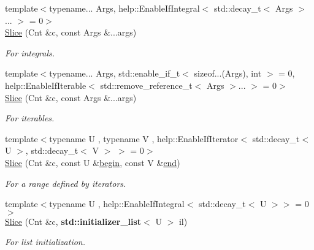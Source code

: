 \begin{DoxyCompactItemize}
\item 
{\footnotesize template$<$typename... Args, help\+::\+Enable\+If\+Integral$<$ std\+::decay\+\_\+t$<$ Args $>$... $>$  = 0$>$ }\\\hyperlink{classcnt_1_1help_1_1Slice_a4ee48993f74932456f8bc49790bd0c6f}{Slice} (Cnt \&c, const Args \&...args)
\begin{DoxyCompactList}\small\item\em For integrals. \end{DoxyCompactList}\item 
{\footnotesize template$<$typename... Args, std\+::enable\+\_\+if\+\_\+t$<$ sizeof...(\+Args), int $>$  = 0, help\+::\+Enable\+If\+Iterable$<$ std\+::remove\+\_\+reference\+\_\+t$<$ Args $>$... $>$  = 0$>$ }\\\hyperlink{classcnt_1_1help_1_1Slice_ad48e78da8f37d92bb4f9a8a913270cfe}{Slice} (Cnt \&c, const Args \&...args)
\begin{DoxyCompactList}\small\item\em For iterables. \end{DoxyCompactList}\item 
{\footnotesize template$<$typename U , typename V , help\+::\+Enable\+If\+Iterator$<$ std\+::decay\+\_\+t$<$ U $>$, std\+::decay\+\_\+t$<$ V $>$ $>$  = 0$>$ }\\\hyperlink{classcnt_1_1help_1_1Slice_a4691d18fed41988537d2bab287cb540b}{Slice} (Cnt \&c, const U \&\hyperlink{classcnt_1_1help_1_1Slice_aa5686f75940716e2568165e3b88d89d3}{begin}, const V \&\hyperlink{classcnt_1_1help_1_1Slice_a0bebfdc0b631e2462b54b2bd44059b76}{end})
\begin{DoxyCompactList}\small\item\em For a range defined by iterators. \end{DoxyCompactList}\item 
{\footnotesize template$<$typename U , help\+::\+Enable\+If\+Integral$<$ std\+::decay\+\_\+t$<$ U $>$$>$  = 0$>$ }\\\hyperlink{classcnt_1_1help_1_1Slice_a9ff9b2280e91eddd2b4e7f342f84aead}{Slice} (Cnt \&c, {\bf std\+::initializer\+\_\+list}$<$ U $>$ il)
\begin{DoxyCompactList}\small\item\em For list initialization. \end{DoxyCompactList}\end{DoxyCompactItemize}

